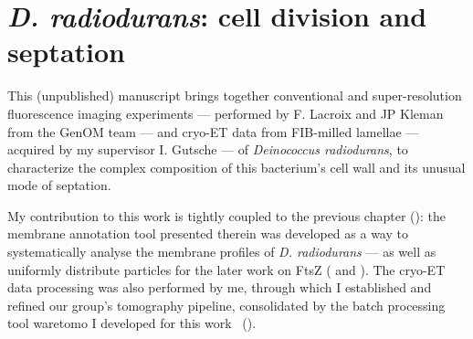 \chapter{\textit{D. radiodurans}: cell division and septation}\label{drad}

This (unpublished) manuscript brings together conventional and super-resolution fluorescence imaging experiments --- performed by F. Lacroix and JP Kleman from the GenOM team --- and cryo-ET data from FIB-milled lamellae --- acquired by my supervisor I. Gutsche --- of \textit{Deinococcus radiodurans}, to characterize the complex composition of this bacterium's cell wall and its unusual mode of septation.

My contribution to this work is tightly coupled to the previous chapter (): the membrane annotation tool presented therein was developed as a way to systematically analyse the membrane profiles of \textit{D. radiodurans} --- as well as uniformly distribute particles for the later work on FtsZ ( and ).
The cryo-ET data processing was also performed by me, through which I established and refined our group's tomography pipeline, consolidated by the batch processing tool waretomo I developed for this work~\cite{gaifasWaretomo2024} ().

\localtableofcontents
\newpage

\newpage
